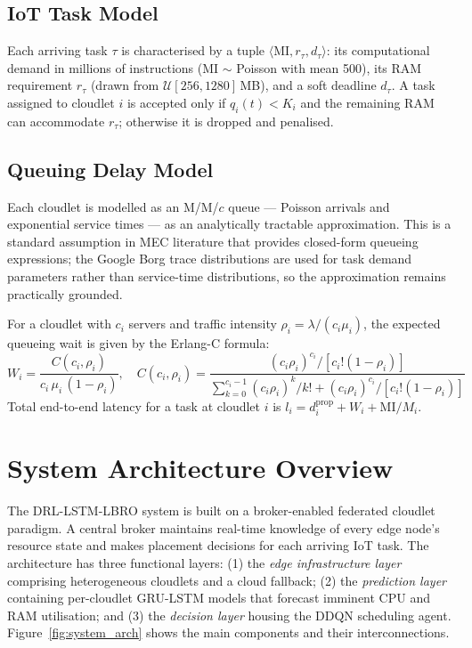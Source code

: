 \subsection{IoT Task Model}

Each arriving task $\tau$ is characterised by a tuple
$\langle \text{MI}, r_\tau, d_\tau \rangle$: its computational
demand in millions of instructions (MI $\sim$ Poisson with
mean 500), its RAM requirement $r_\tau$ (drawn from
$\mathcal{U}[256, 1280]$\,MB), and a soft deadline $d_\tau$.
A task assigned to cloudlet $i$ is accepted only if
$q_i(t) < K_i$ and the remaining RAM can accommodate $r_\tau$;
otherwise it is dropped and penalised.

\subsection{Queuing Delay Model}

Each cloudlet is modelled as an M/M/$c$ queue — Poisson arrivals
and exponential service times — as an analytically tractable
approximation. This is a standard assumption in MEC literature
that provides closed-form queueing expressions; the Google Borg
trace distributions are used for task demand parameters rather
than service-time distributions, so the approximation
remains practically grounded.

For a cloudlet with $c_i$ servers and traffic intensity
$\rho_i = \lambda / (c_i \mu_i)$, the expected queueing wait
is given by the Erlang-C formula:
\begin{equation}
  W_i = \frac{C(c_i, \rho_i)}{c_i\,\mu_i\,(1-\rho_i)},
  \quad
  C(c_i,\rho_i) =
  \frac{(c_i\rho_i)^{c_i} / [c_i!(1-\rho_i)]}
       {\sum_{k=0}^{c_i-1}(c_i\rho_i)^k/k!
        +(c_i\rho_i)^{c_i}/[c_i!(1-\rho_i)]}
  \label{eq:erlang_method}
\end{equation}
Total end-to-end latency for a task at cloudlet $i$ is
$l_i = d_i^{\text{prop}} + W_i + \text{MI}/M_i$.

\section{System Architecture Overview}
\label{sec:overview}

The DRL-LSTM-LBRO system is built on a broker-enabled federated
cloudlet paradigm. A central broker maintains real-time knowledge
of every edge node's resource state and makes placement decisions
for each arriving IoT task. The architecture has three functional
layers: (1) the \emph{edge infrastructure layer} comprising
heterogeneous cloudlets and a cloud fallback; (2) the
\emph{prediction layer} containing per-cloudlet GRU-LSTM models
that forecast imminent CPU and RAM utilisation; and (3) the
\emph{decision layer} housing the DDQN scheduling agent.
Figure~\ref{fig:system_arch} shows the main components and their
interconnections.


